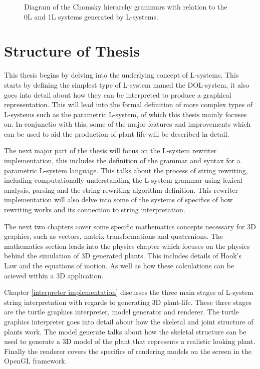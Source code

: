 \begin{figure}[htbp]
	{\centering
		\setlength{\fboxrule}{1pt}
		\vspace{7px}
		\caption{Diagram of the Chomsky hierarchy grammars with relation to the 0L and 1L systems generated by L-systems.} \label{chomsky grammars}
	}
\end{figure}
\FloatBarrier

\section{Structure of Thesis}

This thesis begins by delving into the underlying concept of L-systems. This starts by defining the simplest type of L-system named the DOL-system, it also goes into detail about how they can be interpreted to produce a graphical representation. This will lead into the formal definition of more complex types of L-systems such as the parametric L-system, of which this thesis mainly focuses on. In conjunctio with this, some of the major features and improvements which can be used to aid the production of plant life will be described in detail. 

The next major part of the thesis will focus on the L-system rewriter implementation, this includes the definition of the grammar and syntax for a parametric L-system language. This talks about the process of string rewriting, including computationally understanding the L-system grammar using lexical analysis, parsing and the string rewriting algorithm definition. This rewriter implementation will also delve into some of the systems of specifics of how rewriting works and its connection to string interpretation.

The next two chapters cover some specific mathematics concepts necessary for 3D graphics, such as vectors, matrix transformations and quaternions. The mathematics section leads into the physics chapter which focuses on the physics behind the simulation of 3D generated plants. This includes details of Hook's Law and the equations of motion. As well as how these calculations can be acieved within a 3D application.

Chapter \ref{interpreter implementation} discusses the three main stages of L-system string interpretation with regards to generating 3D plant-life. These three stages are the turtle graphics interpreter, model generator and renderer. The turtle graphics interpreter goes into detail about how the skeletal and joint structure of plants work. The model generate talks about how the skeletal structure can be used to generate a 3D model of the plant that represents a realistic looking plant. Finally the renderer covers the specifics of rendering models on the screen in the OpenGL framework.





